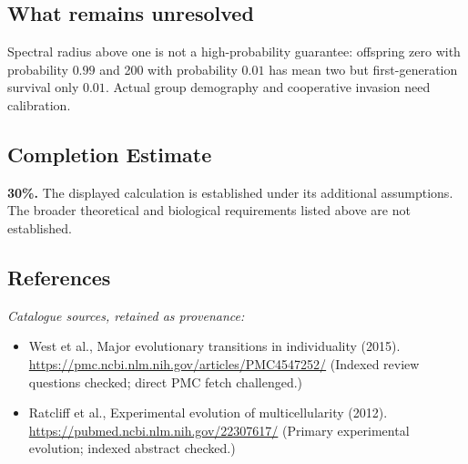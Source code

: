 \documentclass[11pt]{article}
\begin{document}
\subsection{What remains unresolved}
Spectral radius above one is not a high-probability guarantee: offspring zero with probability $0.99$ and 200 with probability $0.01$ has mean two but first-generation survival only $0.01$. Actual group demography and cooperative invasion need calibration.
\subsection{Completion Estimate}
\textbf{30\%.} The displayed calculation is established under its additional assumptions. The broader theoretical and biological requirements listed above are not established.
\subsection{References}
\noindent\emph{Catalogue sources, retained as provenance:}
\begin{itemize}
\item West et al., Major evolutionary transitions in individuality (2015). \url{https://pmc.ncbi.nlm.nih.gov/articles/PMC4547252/} (Indexed review questions checked; direct PMC fetch challenged.)
\item Ratcliff et al., Experimental evolution of multicellularity (2012). \url{https://pubmed.ncbi.nlm.nih.gov/22307617/} (Primary experimental evolution; indexed abstract checked.)
\end{itemize}
\clearpage


\appendix
\end{document}
